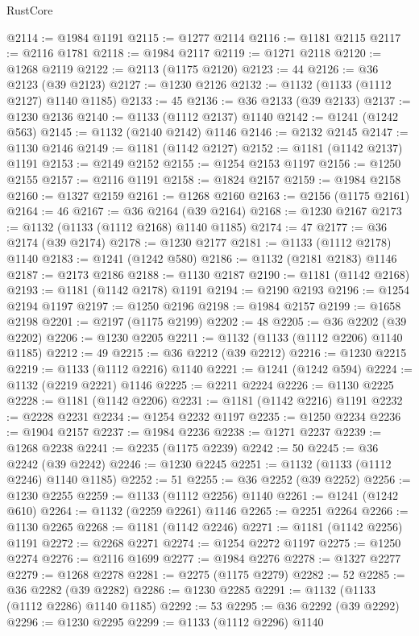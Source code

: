 \begin{lexlean}{RustCore}
\begin{coremodule}
@2114 := @1984 @1191
@2115 := @1277 @2114
@2116 := @1181 @2115
@2117 := @2116 @1781
@2118 := @1984 @2117
@2119 := @1271 @2118
@2120 := @1268 @2119
@2122 := @2113 (@1175 @2120)
@2123 := 44
@2126 := @36 @2123 (@39 @2123)
@2127 := @1230 @2126
@2132 := @1132 (@1133 (@1112 @2127) @1140 @1185)
@2133 := 45
@2136 := @36 @2133 (@39 @2133)
@2137 := @1230 @2136
@2140 := @1133 (@1112 @2137) @1140
@2142 := @1241 (@1242 @563)
@2145 := @1132 (@2140 @2142) @1146
@2146 := @2132 @2145
@2147 := @1130 @2146
@2149 := @1181 (@1142 @2127)
@2152 := @1181 (@1142 @2137) @1191
@2153 := @2149 @2152
@2155 := @1254 @2153 @1197
@2156 := @1250 @2155
@2157 := @2116 @1191
@2158 := @1824 @2157
@2159 := @1984 @2158
@2160 := @1327 @2159
@2161 := @1268 @2160
@2163 := @2156 (@1175 @2161)
@2164 := 46
@2167 := @36 @2164 (@39 @2164)
@2168 := @1230 @2167
@2173 := @1132 (@1133 (@1112 @2168) @1140 @1185)
@2174 := 47
@2177 := @36 @2174 (@39 @2174)
@2178 := @1230 @2177
@2181 := @1133 (@1112 @2178) @1140
@2183 := @1241 (@1242 @580)
@2186 := @1132 (@2181 @2183) @1146
@2187 := @2173 @2186
@2188 := @1130 @2187
@2190 := @1181 (@1142 @2168)
@2193 := @1181 (@1142 @2178) @1191
@2194 := @2190 @2193
@2196 := @1254 @2194 @1197
@2197 := @1250 @2196
@2198 := @1984 @2157
@2199 := @1658 @2198
@2201 := @2197 (@1175 @2199)
@2202 := 48
@2205 := @36 @2202 (@39 @2202)
@2206 := @1230 @2205
@2211 := @1132 (@1133 (@1112 @2206) @1140 @1185)
@2212 := 49
@2215 := @36 @2212 (@39 @2212)
@2216 := @1230 @2215
@2219 := @1133 (@1112 @2216) @1140
@2221 := @1241 (@1242 @594)
@2224 := @1132 (@2219 @2221) @1146
@2225 := @2211 @2224
@2226 := @1130 @2225
@2228 := @1181 (@1142 @2206)
@2231 := @1181 (@1142 @2216) @1191
@2232 := @2228 @2231
@2234 := @1254 @2232 @1197
@2235 := @1250 @2234
@2236 := @1904 @2157
@2237 := @1984 @2236
@2238 := @1271 @2237
@2239 := @1268 @2238
@2241 := @2235 (@1175 @2239)
@2242 := 50
@2245 := @36 @2242 (@39 @2242)
@2246 := @1230 @2245
@2251 := @1132 (@1133 (@1112 @2246) @1140 @1185)
@2252 := 51
@2255 := @36 @2252 (@39 @2252)
@2256 := @1230 @2255
@2259 := @1133 (@1112 @2256) @1140
@2261 := @1241 (@1242 @610)
@2264 := @1132 (@2259 @2261) @1146
@2265 := @2251 @2264
@2266 := @1130 @2265
@2268 := @1181 (@1142 @2246)
@2271 := @1181 (@1142 @2256) @1191
@2272 := @2268 @2271
@2274 := @1254 @2272 @1197
@2275 := @1250 @2274
@2276 := @2116 @1699
@2277 := @1984 @2276
@2278 := @1327 @2277
@2279 := @1268 @2278
@2281 := @2275 (@1175 @2279)
@2282 := 52
@2285 := @36 @2282 (@39 @2282)
@2286 := @1230 @2285
@2291 := @1132 (@1133 (@1112 @2286) @1140 @1185)
@2292 := 53
@2295 := @36 @2292 (@39 @2292)
@2296 := @1230 @2295
@2299 := @1133 (@1112 @2296) @1140

\end{coremodule}
\end{lexlean}
